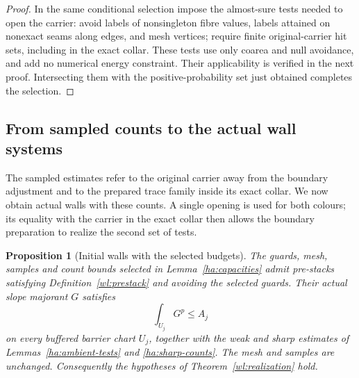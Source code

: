 \documentclass[11pt]{article}
\numberwithin{equation}{section}
\newtheorem{proposition}[theorem]{Proposition}
\theoremstyle{definition}
\theoremstyle{remark}
\begin{document}
\begin{proof}
In the same conditional selection impose the almost-sure tests
needed to open the carrier: avoid labels of nonsingleton fibre
values, labels attained on nonexact seams along edges, and mesh
vertices; require finite original-carrier hit sets, including in
the exact collar.  These tests use only coarea and null avoidance,
and add no numerical energy constraint.  Their applicability is
verified in the next proof.  Intersecting them with the
positive-probability set just obtained completes the selection.
\end{proof}

\subsection{From sampled counts to the actual wall systems}
\label{ha:wall-transfer}

The sampled estimates refer to the original carrier away from the
boundary adjustment and to the prepared trace family inside its
exact collar.  We now obtain actual walls with these counts.  A
single opening is used for both colours; its equality with the
carrier in the exact collar then allows the boundary preparation
to realize the second set of tests.

\begin{proposition}[Initial walls with the selected budgets]
\label{ha:initial-walls}
The guards, mesh, samples and count bounds selected in
Lemma~\ref{ha:capacities} admit pre-stacks satisfying
Definition~\ref{wl:prestack} and avoiding the selected guards.
Their actual slope majorant $G$ satisfies
\[
                         \int_{U_j}G^p\le A_j
\]
on every buffered barrier chart $U_j$, together with the weak and
sharp estimates of Lemmas~\ref{ha:ambient-tests} and
\ref{ha:sharp-counts}.  The mesh and samples are unchanged.
Consequently the hypotheses of Theorem~\ref{wl:realization} hold.
\end{proposition}
\end{document}
